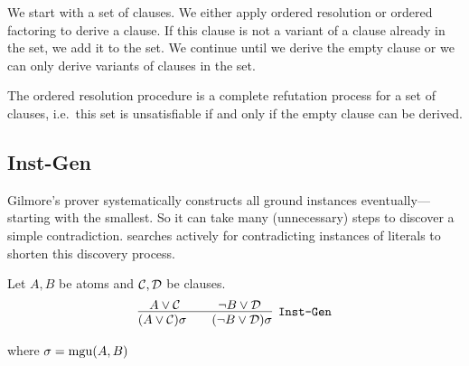 \begin{procedure} We start with a set of clauses. We either apply ordered resolution or ordered factoring to derive a clause. If this clause is not a variant of a clause already in the set, we add it to the set. We continue until we derive the empty clause or we can only derive variants of clauses in the set.
\end{procedure}

\begin{lemma}
	The ordered resolution procedure is a complete refutation process for a set of clauses, 
	i.e.~this set is unsatisfiable if and only if the empty clause can be derived.
\end{lemma}




\subsection{Inst-Gen}\label{sec:inst:gen}

Gilmore's prover systematically constructs all ground instances eventually---starting with the smallest. So it can take many (unnecessary) steps to discover a simple contradiction. 
\InstGen searches actively for contradicting instances of literals to shorten this discovery process.

\begin{definition} Let \( A, B \) be atoms and \( \mathcal{C},\mathcal{D} \) be clauses.
	\begin{gather*}
	\infer
	[{\InstGen}]
	{(A\lor\mathcal C)\sigma\qquad (\lnot B\lor\mathcal D)\sigma}
	{A\lor\mathcal C\quad&\quad \lnot B\lor\mathcal D}
	\end{gather*}
	\begin{center}where \( \sigma=\operatorname{mgu}(A,B) \)
	\end{center}
\end{definition}

